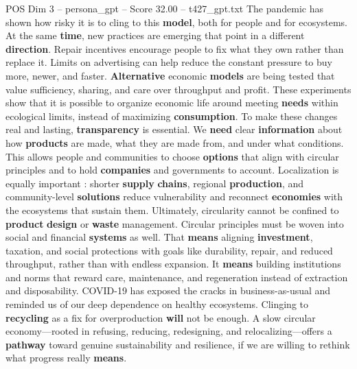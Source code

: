 \begin{textsample}{POS Dim 3 – persona\_gpt – Score 32.00 – t427\_gpt.txt}
The pandemic has shown how risky it is to cling to this \textbf{model}, both for people and for ecosystems.
At the same \textbf{time}, new practices are emerging that point in a different \textbf{direction}.
Repair incentives encourage people to fix what they own rather than replace it.
Limits on advertising can help reduce the constant pressure to buy more, newer, and faster. \textbf{Alternative} economic \textbf{models} are being tested that value sufficiency, sharing, and care over throughput and profit.
These experiments show that it is possible to organize economic life around meeting \textbf{needs} within ecological limits, instead of maximizing \textbf{consumption}.
To make these changes real and lasting, \textbf{transparency} is essential.
We \textbf{need} clear \textbf{information} about how \textbf{products} are made, what they are made from, and under what conditions.
This allows people and communities to choose \textbf{options} that align with circular principles and to hold \textbf{companies} and governments to account.
Localization is equally important : shorter \textbf{supply} \textbf{chains}, regional \textbf{production}, and community-level \textbf{solutions} reduce vulnerability and reconnect \textbf{economies} with the ecosystems that sustain them.
Ultimately, circularity cannot be confined to \textbf{product} \textbf{design} or \textbf{waste} management.
Circular principles must be woven into social and financial \textbf{systems} as well.
That \textbf{means} aligning \textbf{investment}, taxation, and social protections with goals like durability, repair, and reduced throughput, rather than with endless expansion.
It \textbf{means} building institutions and norms that reward care, maintenance, and regeneration instead of extraction and disposability.
COVID-19 has exposed the cracks in business-as-usual and reminded us of our deep dependence on healthy ecosystems.
Clinging to \textbf{recycling} as a fix for overproduction \textbf{will} not be enough.
A slow circular economy—rooted in refusing, reducing, redesigning, and relocalizing—offers a \textbf{pathway} toward genuine sustainability and resilience, if we are willing to rethink what progress really \textbf{means}.

\end{textsample}
